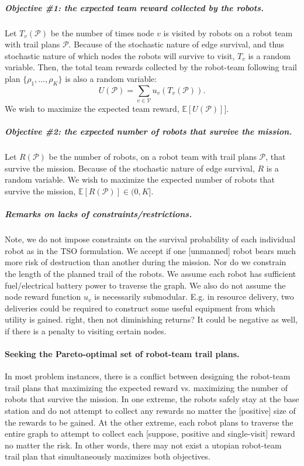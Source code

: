 \documentclass[11pt, oneside]{article}
\begin{document}
\vspace{-\baselineskip}
\subparagraph{Objective \#1: the expected team reward collected by the robots.}
Let $T_v(\mathcal{P}) $ be the number of times node $v$ is visited by robots on a robot team with trail plans $\mathcal{P}$. Because of the stochastic nature of edge survival, and thus stochastic nature of which nodes the robots will survive to visit, $T_v$ is a random variable.
Then, the total team rewards collected by the robot-team following trail plan $\{\rho_1, ..., \rho_K\}$ is also a random variable:
\begin{equation}
U(\mathcal{P}) = \sum_{v\in\mathcal{V}} u_v\left ( T_v(\mathcal{P}) \right).
\end{equation}
We wish to maximize the expected team reward, $\mathbb{E}[U(\mathcal{P})]]$.

\vspace{-\baselineskip}
\subparagraph{Objective \#2: the expected number of robots that survive the mission.}
Let $R(\mathcal{P})$ be the number of robots, on a robot team with trail plans $\mathcal{P}$, that survive the mission. Because of the stochastic nature of edge survival, $R$ is a random variable. We wish to maximize the expected number of robots that survive the mission, $\mathbb{E}[R(\mathcal{P})] \in (0, K]$.

\subparagraph{Remarks on lacks of constraints/restrictions.} Note, we do not impose constraints on the survival probability of each individual robot as in the TSO formulation. We accept if one [unmanned] robot bears much more risk of destruction than another during the mission. Nor do we constrain the length of the planned trail of the robots. We assume each robot has sufficient fuel/electrical battery power to traverse the graph. We also do not assume the node reward function $u_v$ is necessarily submodular. E.g. in resource delivery, two deliveries could be required to construct some useful equipment from which utility is gained. {\color{red} right, then not diminishing returns?}
 It could be negative as well, if there is a penalty to visiting certain nodes.

\paragraph{Seeking the Pareto-optimal set of robot-team trail plans.} In most problem instances, there is a conflict between designing the robot-team trail plans that maximizing the expected reward vs. maximizing the number of robots that survive the mission. 
In one extreme, the robots safely stay at the base station and do not attempt to collect any rewards no matter the [positive] size of the rewards to be gained. 
At the other extreme, each robot plans to traverse the entire graph to attempt to collect each [suppose, positive and single-visit] reward no matter the risk.
In other words, there may not exist a utopian robot-team trail plan that simultaneously maximizes both objectives. 
\end{document}

